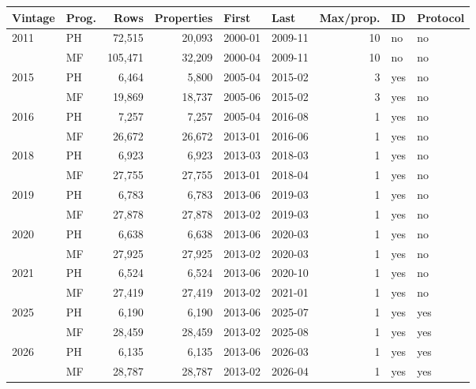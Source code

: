 \begin{tabular}{llrrllrll}
\toprule
Vintage & Prog. & Rows & Properties & First & Last & Max/prop. & ID & Protocol \\
\midrule
2011 & PH & 72,515 & 20,093 & 2000-01 & 2009-11 & 10 & no & no \\
 & MF & 105,471 & 32,209 & 2000-04 & 2009-11 & 10 & no & no \\
2015 & PH & 6,464 & 5,800 & 2005-04 & 2015-02 & 3 & yes & no \\
 & MF & 19,869 & 18,737 & 2005-06 & 2015-02 & 3 & yes & no \\
2016 & PH & 7,257 & 7,257 & 2005-04 & 2016-08 & 1 & yes & no \\
 & MF & 26,672 & 26,672 & 2013-01 & 2016-06 & 1 & yes & no \\
2018 & PH & 6,923 & 6,923 & 2013-03 & 2018-03 & 1 & yes & no \\
 & MF & 27,755 & 27,755 & 2013-01 & 2018-04 & 1 & yes & no \\
2019 & PH & 6,783 & 6,783 & 2013-06 & 2019-03 & 1 & yes & no \\
 & MF & 27,878 & 27,878 & 2013-02 & 2019-03 & 1 & yes & no \\
2020 & PH & 6,638 & 6,638 & 2013-06 & 2020-03 & 1 & yes & no \\
 & MF & 27,925 & 27,925 & 2013-02 & 2020-03 & 1 & yes & no \\
2021 & PH & 6,524 & 6,524 & 2013-06 & 2020-10 & 1 & yes & no \\
 & MF & 27,419 & 27,419 & 2013-02 & 2021-01 & 1 & yes & no \\
2025 & PH & 6,190 & 6,190 & 2013-06 & 2025-07 & 1 & yes & yes \\
 & MF & 28,459 & 28,459 & 2013-02 & 2025-08 & 1 & yes & yes \\
2026 & PH & 6,135 & 6,135 & 2013-06 & 2026-03 & 1 & yes & yes \\
 & MF & 28,787 & 28,787 & 2013-02 & 2026-04 & 1 & yes & yes \\
\bottomrule
\end{tabular}
